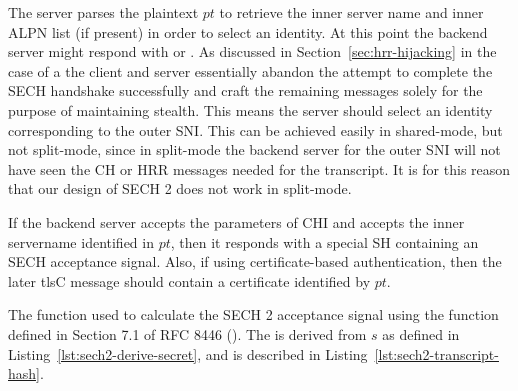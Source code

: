 The server parses the plaintext $pt$
to retrieve the inner server name and inner \ac{ALPN} list
(if present)
in order to select an identity.
At this point the backend server might respond with  or .
As discussed in Section~\ref{sec:hrr-hijacking} in the case of a 
the client and server essentially abandon the attempt to complete the \ac{SECH}
handshake successfully and craft the remaining messages solely for the purpose
of maintaining stealth.
This means the server should select an identity corresponding to the outer \ac{SNI}.
This can be achieved easily in shared-mode, but not split-mode,
since in split-mode the backend server for the outer \ac{SNI}
will not have seen the \ac{CH} or \ac{HRR} messages
needed for the transcript.
It is for this reason that our design of \ac{SECH} 2 does not work in split-mode.

If the backend server accepts the parameters of \ac{CHI}
and accepts the inner servername identified in $pt$,
then it responds with a special \ac{SH} containing an \ac{SECH} acceptance signal.
Also, if using certificate-based authentication, then the later \ac{tlsC} message should contain a certificate identified by $pt$.

\begin{listing}[H]
\centering
{}
\captionsetup{width=.8\linewidth} 
\caption[SECH 2 Accept Confirmation]{The function used to calculate the SECH 2 acceptance signal using the  function defined in Section 7.1 of RFC 8446 (\cite{rfc8446}). The  is derived from $s$ as defined in Listing~\ref{lst:sech2-derive-secret}, and  is described in Listing~\ref{lst:sech2-transcript-hash}.}
\label{lst:sech2-accept-function}
\end{listing}

